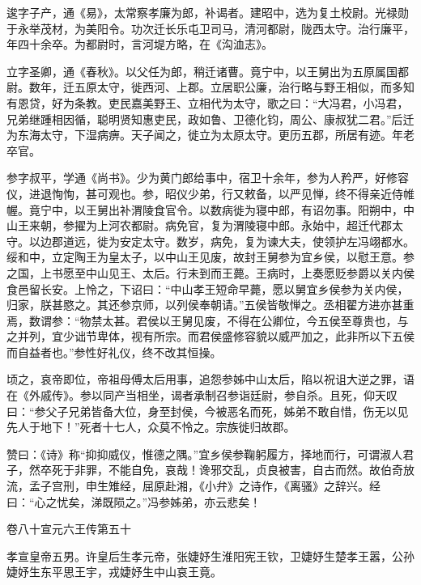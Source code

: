 \documentclass[12pt,UTF8]{ctexbook}
\begin{document}
逡字子产，通《易》，太常察孝廉为郎，补谒者。建昭中，选为复土校尉。光禄勋于永举茂材，为美阳令。功次迁长乐屯卫司马，清河都尉，陇西太守。治行廉平，年四十余卒。为都尉时，言河堤方略，在《沟洫志》。



立字圣卿，通《春秋》。以父任为郎，稍迁诸曹。竟宁中，以王舅出为五原属国都尉。数年，迁五原太守，徙西河、上郡。立居职公廉，治行略与野王相似，而多知有恩贷，好为条教。吏民嘉美野王、立相代为太守，歌之曰：“大冯君，小冯君，兄弟继踵相因循，聪明贤知惠吏民，政如鲁、卫德化钧，周公、康叔犹二君。”后迁为东海太守，下湿病痹。天子闻之，徙立为太原太守。更历五郡，所居有迹。年老卒官。



参字叔平，学通《尚书》。少为黄门郎给事中，宿卫十余年，参为人矜严，好修容仪，进退恂恂，甚可观也。参，昭仪少弟，行又敕备，以严见惮，终不得亲近侍帷幄。竟宁中，以王舅出补渭陵食官令。以数病徙为寝中郎，有诏勿事。阳朔中，中山王来朝，参擢为上河农都尉。病免官，复为渭陵寝中郎。永始中，超迁代郡太守。以边郡道远，徙为安定太守。数岁，病免，复为谏大夫，使领护左冯翊都水。绥和中，立定陶王为皇太子，以中山王见废，故封王舅参为宜乡侯，以慰王意。参之国，上书愿至中山见王、太后。行未到而王薨。王病时，上奏愿贬参爵以关内侯食邑留长安。上怜之，下诏曰：“中山孝王短命早薨，愿以舅宜乡侯参为关内侯，归家，朕甚愍之。其还参京师，以列侯奉朝请。”五侯皆敬惮之。丞相翟方进亦甚重焉，数谓参：“物禁太甚。君侯以王舅见废，不得在公卿位，今五侯至尊贵也，与之并列，宜少诎节卑体，视有所宗。而君侯盛修容貌以威严加之，此非所以下五侯而自益者也。”参性好礼仪，终不改其恒操。



顷之，哀帝即位，帝祖母傅太后用事，追怨参姊中山太后，陷以祝诅大逆之罪，语在《外戚传》。参以同产当相坐，谒者承制召参诣廷尉，参自杀。且死，仰天叹曰：“参父子兄弟皆备大位，身至封侯，今被恶名而死，姊弟不敢自惜，伤无以见先人于地下！”死者十七人，众莫不怜之。宗族徙归故郡。



赞曰：《诗》称“抑抑威仪，惟德之隅。”宜乡侯参鞠躬履方，择地而行，可谓淑人君子，然卒死于非罪，不能自免，哀哉！谗邪交乱，贞良被害，自古而然。故伯奇放流，孟子宫刑，申生雉经，屈原赴湘，《小弁》之诗作，《离骚》之辞兴。经曰：“心之忧矣，涕既陨之。”冯参姊弟，亦云悲矣！





卷八十宣元六王传第五十



孝宣皇帝五男。许皇后生孝元帝，张婕妤生淮阳宪王钦，卫婕妤生楚孝王嚣，公孙婕妤生东平思王宇，戎婕妤生中山哀王竟。
\end{document}
